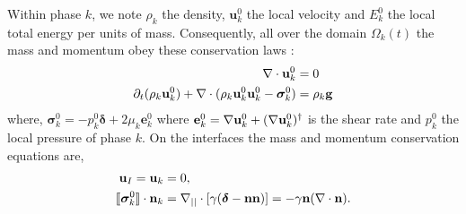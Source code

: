 Within phase $k$, we note $\rho_k$ the density, $\textbf{u}_k^0$ the local velocity and $E_k^0$ the local total energy per units of mass.
Consequently, all over the domain $\Omega_k(t)$ the mass and momentum obey these conservation laws :
\begin{align}
    \mathbf{\nabla}\cdot 
        \textbf{u}_k^0
    &= 
    0\\
    \partial_t (\rho_k\textbf{u}_k^0)  
    + \mathbf{\nabla}\cdot (
        \rho_k\textbf{u}_k^0\textbf{u}_k^0
        - \bm{\sigma}_k^0 
    )
    &= 
    \rho_k \textbf{g}\\
\end{align} 
where, $\bm{\sigma}_k^0 = - p_k^0 \bm\delta + 2\mu_k \textbf{e}_k^0$ where $\textbf{e}_k^0 = \mathbf{\nabla} \textbf{u}_k^0 + (\mathbf{\nabla} \textbf{u}_k^0)^\dagger$ is the shear rate and $p_k^0$ the local pressure of phase $k$. 
On the interfaces the mass and momentum conservation equations are,
\begin{align}
    \textbf{u}_I = \textbf{u}_k
    &=0, \\
    \llbracket \bm{\sigma}_k^0 \rrbracket \cdot \textbf{n}_k 
    &=
    \mathbf{\nabla}_{||}\cdot[\gamma(\bm\delta - \textbf{nn})]
    =
    - \gamma\textbf{n} (\mathbf{\nabla}\cdot \textbf{n}).
\end{align}

